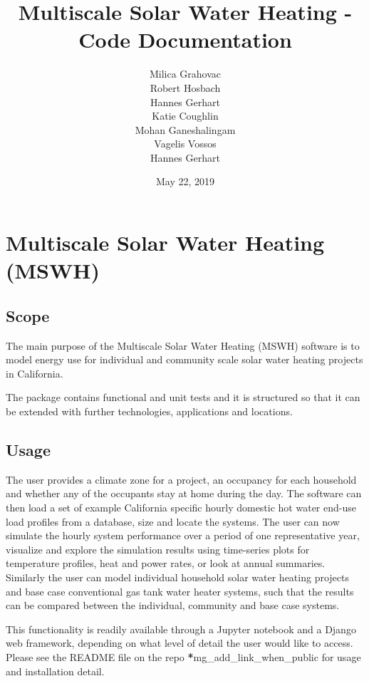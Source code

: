 \documentclass[letterpaper,10pt,english,openany]{sphinxmanual}
\title{Multiscale Solar Water Heating - Code Documentation}
\date{May 22, 2019}
\author{Milica Grahovac \\ Robert Hosbach \\ Hannes Gerhart \\ Katie Coughlin \\ Mohan Ganeshalingam \\ Vagelis Vossos \\ Hannes Gerhart}
\begin{document}
\pagestyle{empty}
\sphinxmaketitle
\pagestyle{plain}
\sphinxtableofcontents
\pagestyle{normal}
\label{\detokenize{index::doc}}



\chapter{Multiscale Solar Water Heating (MSWH)}
\label{\detokenize{source/models:multiscale-solar-water-heating-mswh}}\label{\detokenize{source/models:sec-sys-mod}}\label{\detokenize{source/models::doc}}

\section{Scope}
\label{\detokenize{source/models:scope}}
The main purpose of the Multiscale Solar Water Heating (MSWH) software is to model energy use for individual and community scale solar water heating projects in California.

The package contains functional and unit tests and it is structured so that it can be extended with further technologies, applications and locations.


\section{Usage}
\label{\detokenize{source/models:usage}}
The user provides a climate zone for a project, an occupancy for each household and whether any of the occupants stay at home during the day. The software can then load a set of example California specific hourly domestic hot water end-use load profiles from a database, size and locate the systems. The user can now simulate the hourly system performance over a period of one representative year, visualize and explore the simulation results using time-series plots for temperature profiles, heat and power rates, or look at annual summaries. Similarly the user can model individual household solar water heating projects and base case conventional gas tank water heater systems, such that the results can be compared between the individual, community and base case systems.

This functionality is readily available through a Jupyter notebook and a Django web framework, depending on what level of detail the user would like to access. Please see the README file on the repo {\color{red}\bfseries{}*}mg\_add\_link\_when\_public for usage and installation detail.
\end{document}
